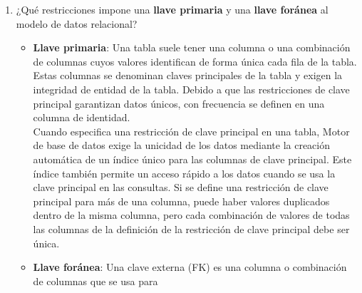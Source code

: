 \documentclass[a4paper, 12pt]{report}
\begin{document}
{\begin{enumerate}[label=(\alph*)]
\begin{itemize}
			conjunto de uno o más atributos de una tabla, que tomados 	
			colectivamente nos permiten identificar un registro como 				único, es decir, en una tabla podemos saber cual es un 	
			registro en específico sólo con conocer la llave 	
			primaria.
			\item \textbf{Llave candidata}:  Una llave candidata es					el atributo o conjunto de atributos que 	
			tienen la propiedad de identificar unívocamente a una 	
			tupla dentro de la relación. Las llaves constituyen el 	
			mecanismo de direccionamiento a nivel de tuplas básico en 				un sistema relacional, es decir, es el único modo, 						garantizado por el sistema, de localizar alguna tupla 					específica.
			\item\textbf{Super llave}: Una super llave es un conjunto 				de uno o más atributos que tomados colectivamente,permiten 			identificar de forma única una entidad en el conjunto de 
			entidades.
			\item \textbf{Llave mínima}: Es equivalente a la llave 		
			candidata.
		\end{itemize}
		\item ¿Qué restricciones impone una \textbf{llave primaria} y 			una \textbf{llave foránea} al modelo de datos relacional?
		\begin{itemize}
			\item \textbf{Llave primaria}: Una tabla suele tener una 	
			columna o una combinación de columnas cuyos valores 	
			identifican de forma única cada fila de la tabla. Estas 	
			columnas se denominan claves principales de la tabla y 	
			exigen la integridad de entidad de la tabla. Debido a que 	
			las restricciones de clave principal garantizan datos 	
			únicos, con frecuencia se definen en una columna de 	
			identidad.\\
			Cuando especifica una restricción de clave principal en 	
			una tabla, Motor de base de datos exige la unicidad de los 			datos mediante la creación automática de un índice único 	
			para las columnas de clave principal. Este índice también 	
			permite un acceso rápido a los datos cuando se usa la 	
			clave principal en las consultas. Si se define una 	
			restricción de clave principal para más de una columna, 	
			puede haber valores duplicados dentro de la misma columna, 			pero cada combinación de valores de todas las columnas de 	
			la definición de la restricción de clave principal debe 	
			ser única.
			\item \textbf{Llave foránea}: Una clave externa (FK) es 	
			una columna o combinación de columnas que se usa para 	

\end{itemize}
\end{enumerate}}
\end{document}
